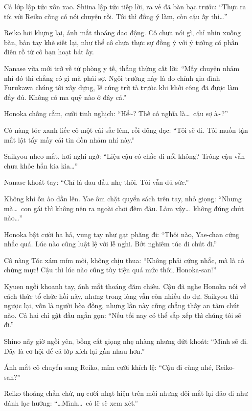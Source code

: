 \documentclass[../main.tex]{subfiles}
\begin{document}
Cả lớp lập tức xôn xao. Shiina lập tức tiếp lời, ra vẻ đã bàn bạc trước: ``Thực ra tôi với Reiko cũng có nói chuyện rồi. Tôi thì đồng ý làm, còn cậu ấy thì\dots''

Reiko hơi khựng lại, ánh mắt thoáng dao động. Cô chưa nói gì, chỉ nhìn xuống bàn, bàn tay khẽ siết lại, như thể cô chưa thực sự đồng ý với ý tưởng có phần điên rồ từ cô bạn hoạt bát ấy.

Nanase vừa mới trở về từ phòng y tế, thẳng thừng cất lời: ``Mấy chuyện nhảm nhí đó thì chẳng có gì mà phải sợ. Ngôi trường này là do chính gia đình Furukawa chúng tôi xây dựng, lễ cúng trừ tà trước khi khởi công đã được làm đầy đủ. Không có ma quỷ nào ở đây cả.''


Honoka chống cằm, cười tinh nghịch: ``Hể\~{}? Thế có nghĩa là\dots\ cậu sợ à\~{}?''

Cô nàng tóc xanh liếc cô một cái sắc lẻm, rồi dõng dạc: ``Tôi sẽ đi. Tôi muốn tận mắt lật tẩy mấy cái tin đồn nhảm nhí này.''

Saikyou nheo mắt, hơi nghi ngờ: ``Liệu cậu có chắc đi nổi không? Trông cậu vẫn chưa khỏe hẳn kia kìa\dots''

Nanase khoát tay: ``Chỉ là đau đầu nhẹ thôi. Tôi vẫn đủ sức.''

Không khí ồn ào dần lên. Yae ôm chặt quyển sách trên tay, nhỏ giọng: ``Nhưng mà\dots\ con gái thì không nên ra ngoài chơi đêm đâu. Làm vậy\dots\ không đúng chút nào\dots''

Honoka bật cười ha hả, vung tay như gạt phăng đi: ``Thôi nào, Yae-chan cứng nhắc quá. Lúc nào cũng luật lệ với lễ nghi. Bớt nghiêm túc đi chút đi.''

Cô nàng Tóc xám mím môi, không chịu thua: ``Không phải cứng nhắc, mà là có chừng mực! Cậu thì lúc nào cũng tùy tiện quá mức thôi, Honoka-san!''

Kyuen ngồi khoanh tay, ánh mắt thoáng đăm chiêu. Cậu đã nghe Honoka nói về cách thức tổ chức hồi nãy, nhưng trong lòng vẫn còn nhiều do dự. Saikyou thì ngược lại, vốn là người hòa đồng, nhưng lần này cũng chẳng thấy an tâm chút nào. Cả hai chỉ gật đầu ngắn gọn: ``Nếu tối nay có thể sắp xếp thì chúng tôi sẽ đi.''

Shino nãy giờ ngồi yên, bỗng cất giọng nhẹ nhàng nhưng dứt khoát: ``Mình sẽ đi. Đây là cơ hội để cả lớp xích lại gần nhau hơn.''

Ánh mắt cô chuyển sang Reiko, mỉm cười khích lệ: ``Cậu đi cùng nhé, Reiko-san?''

Reiko thoáng chần chừ, nụ cười nhạt hiện trên môi nhưng đôi mắt lại đảo đi như đánh lạc hướng: ``\dots Mình\dots\ có lẽ sẽ xem xét.''
\end{document}
